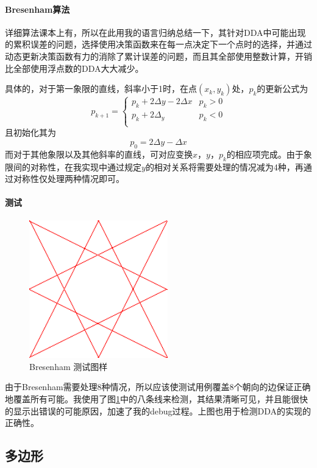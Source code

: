 \documentclass[a4paper,UTF8]{article}
\theoremstyle{definition}
\begin{document}
\paragraph{Bresenham算法} 详细算法课本上有，所以在此用我的语言归纳总结一下，其针对DDA中可能出现的累积误差的问题，选择使用决策函数来在每一点决定下一个点时的选择，并通过动态更新决策函数有力的消除了累计误差的问题，而且其全部使用整数计算，开销比全部使用浮点数的DDA大大减少。
\par 具体的，对于第一象限的直线，斜率小于1时，在点$(x_k,y_k)$处，$p_k$的更新公式为
\begin{equation}
p_{k+1}=\left\{
\begin{array}{ll}
p_k+2\Delta y-2\Delta x & p_k>0 \\
p_k+2\Delta_y & p_k<0 \\
\end{array}
\right.
\end{equation}
且初始化其为
\begin{equation}
p_0=2\Delta y-\Delta x
\end{equation}
而对于其他象限以及其他斜率的直线，可对应变换$x$，$y$，$p_k$的相应项完成。由于象限间的对称性，在我实现中通过规定$y$的相对关系将需要处理的情况减为4种，再通过对称性仅处理两种情况即可。
\paragraph{测试}
\begin{figure}
	\centering
	\includegraphics[height=6cm]{1.png}
	\caption{Bresenham 测试图样}
	\label{testLine}
\end{figure}
由于Bresenham需要处理8种情况，所以应该使测试用例覆盖8个朝向的边保证正确地覆盖所有可能。我使用了图\ref{testLine}中的八条线来检测，其结果清晰可见，并且能很快的显示出错误的可能原因，加速了我的debug过程。上图也用于检测DDA的实现的正确性。
\subsection{多边形}
\end{document}
